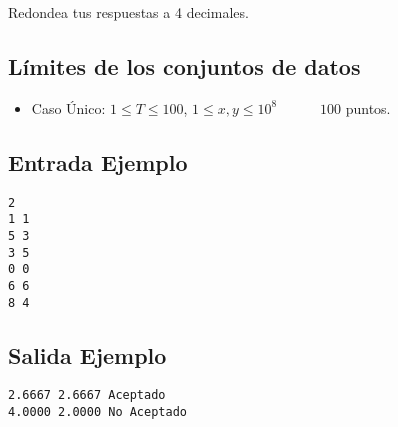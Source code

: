 Redondea tus respuestas a 4 decimales.



\subsection*{Límites de los conjuntos de datos}

\begin{itemize}
    \item Caso Único: $ 1 \leq T \leq 100 $, $ 1 \leq x, 
    y \leq 10^8 $   $\quad \;\;\;\;\;$ $100$ puntos.
\end{itemize}



\begin{multicols}{2}

\subsection*{Entrada Ejemplo}

\begin{verbatim}
2
1 1
5 3
3 5
0 0
6 6
8 4
\end{verbatim}

\columnbreak


\subsection*{Salida Ejemplo}

\begin{verbatim}
2.6667 2.6667 Aceptado
4.0000 2.0000 No Aceptado
\end{verbatim}

\end{multicols}
